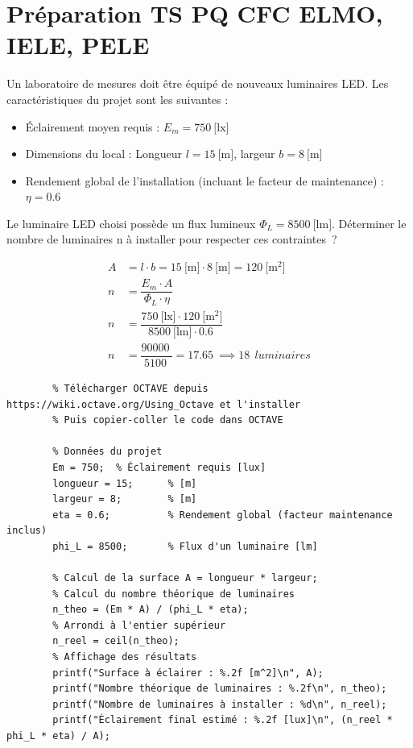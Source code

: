 \documentclass[a4paper,11pt,answers,addpoints]{exam}
\begin{document}
	
	
	\unframedsolutions
	\pointsinmargin
	\bracketedpoints
	\section*{Préparation TS PQ CFC ELMO, IELE, PELE}
	\begin{questions}

\question[9]
Un laboratoire de mesures doit être équipé de nouveaux luminaires LED. Les caractéristiques du projet sont les suivantes : 
\begin{itemize} 
	\item Éclairement moyen requis : $E_m = \qty{750}{[\lux]}$ 
	\item Dimensions du local : Longueur $l = \qty{15}{[\meter]}$, largeur $b = \qty{8}{[\meter]}$ 
	\item Rendement global de l'installation (incluant le facteur de maintenance) : $\eta = \qty{0,6}{}$ 
	\end{itemize} 
	Le luminaire LED choisi possède un flux lumineux $\Phi_L = \qty{8500}{[\lumen]}$. Déterminer le nombre de luminaires n à installer pour respecter ces contraintes~?
\begin{solution} 
	\begin{align*} 
		A &= l \cdot b = \qty{15}{[\meter]} \cdot \qty{8}{[\meter]} = \qty{120}{[\meter^2]} \\[6pt] 
		n &= \dfrac{E_m \cdot A}{\Phi_L \cdot \eta} \\[6pt] 
		n &= \dfrac{\qty{750}{[\lux]} \cdot \qty{120}{[\meter^2]}}{\qty{8500}{[\lumen]} \cdot \qty{0,6}{}} \\[6pt] 
		n &= \dfrac{\qty{90000}{}}{\qty{5100}{}} = \qty{17,65}{} \implies \qty{18}{~luminaires} 
	\end{align*}
	\begin{verbatim} 
		% Télécharger OCTAVE depuis https://wiki.octave.org/Using_Octave et l'installer 
		% Puis copier-coller le code dans OCTAVE
		
		% Données du projet 
		Em = 750;  % Éclairement requis [lux] 
		longueur = 15;      % [m] 
		largeur = 8;        % [m] 
		eta = 0.6;          % Rendement global (facteur maintenance inclus) 
		phi_L = 8500;       % Flux d'un luminaire [lm]
		
		% Calcul de la surface A = longueur * largeur;
		% Calcul du nombre théorique de luminaires 
		n_theo = (Em * A) / (phi_L * eta);
		% Arrondi à l'entier supérieur 
		n_reel = ceil(n_theo);
		% Affichage des résultats 
		printf("Surface à éclairer : %.2f [m^2]\n", A); 
		printf("Nombre théorique de luminaires : %.2f\n", n_theo); 
		printf("Nombre de luminaires à installer : %d\n", n_reel); 
		printf("Éclairement final estimé : %.2f [lux]\n", (n_reel * phi_L * eta) / A); 
	\end{verbatim} 
\end{solution}
\end{questions}
\end{document}
